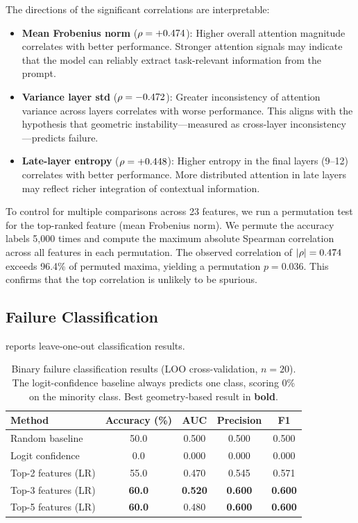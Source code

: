 The directions of the significant correlations are interpretable:
\begin{itemize}[leftmargin=*,itemsep=0pt,topsep=0pt]
    \item \textbf{Mean Frobenius norm} ($\rho = +0.474$): Higher overall attention magnitude correlates with better performance. Stronger attention signals may indicate that the model can reliably extract task-relevant information from the prompt.
    \item \textbf{Variance layer std} ($\rho = -0.472$): Greater inconsistency of attention variance across layers correlates with worse performance. This aligns with the hypothesis that geometric instability---measured as cross-layer inconsistency---predicts failure.
    \item \textbf{Late-layer entropy} ($\rho = +0.448$): Higher entropy in the final layers (9--12) correlates with better performance. More distributed attention in late layers may reflect richer integration of contextual information.
\end{itemize}

To control for multiple comparisons across 23 features, we run a permutation test for the top-ranked feature (mean Frobenius norm).
We permute the accuracy labels 5{,}000 times and compute the maximum absolute Spearman correlation across all features in each permutation.
The observed correlation of $|\rho| = 0.474$ exceeds 96.4\% of permuted maxima, yielding a permutation $p = 0.036$.
This confirms that the top correlation is unlikely to be spurious.

\subsection{Failure Classification}
\label{sec:classification}

 reports leave-one-out classification results.

\begin{table}[t]
    \centering
    \caption{Binary failure classification results (LOO cross-validation, $n = 20$). The logit-confidence baseline always predicts one class, scoring 0\% on the minority class. Best geometry-based result in \textbf{bold}.}
    \label{tab:classifiers}
    \begin{tabular}{@{}lcccc@{}}
        \toprule
        \textbf{Method} & \textbf{Accuracy (\%)} & \textbf{AUC} & \textbf{Precision} & \textbf{F1} \\
        \midrule
        Random baseline       & 50.0 & 0.500 & 0.500 & 0.500 \\
        Logit confidence      & 0.0  & 0.000 & 0.000 & 0.000 \\
        \midrule
        Top-2 features (LR)   & 55.0 & 0.470 & 0.545 & 0.571 \\
        Top-3 features (LR)   & \textbf{60.0} & \textbf{0.520} & \textbf{0.600} & \textbf{0.600} \\
        Top-5 features (LR)   & \textbf{60.0} & 0.480 & \textbf{0.600} & \textbf{0.600} \\
        \bottomrule
    \end{tabular}
\end{table}

